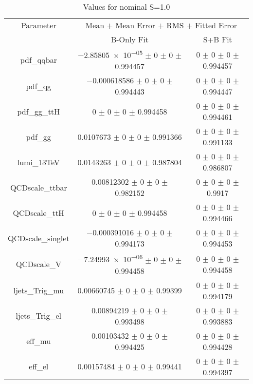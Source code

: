 \begin{table}
\centering
\caption{Values for nominal S=1.0}
\begin{tabular}{ccc}
\toprule
Parameter & \multicolumn{2}{c}{Mean $\pm$ Mean Error $\pm$ RMS $\pm$ Fitted Error}\\
 & B-Only Fit & S+B Fit\\
\midrule
pdf\_qqbar & \num{-2.85805e-05} $\pm$ \num{0} $\pm$ \num{0} $\pm$ \num{0.994457} & \num{0} $\pm$ \num{0} $\pm$ \num{0} $\pm$ \num{0.994457}\\
pdf\_qg & \num{-0.000618586} $\pm$ \num{0} $\pm$ \num{0} $\pm$ \num{0.994443} & \num{0} $\pm$ \num{0} $\pm$ \num{0} $\pm$ \num{0.994447}\\
pdf\_gg\_ttH & \num{0} $\pm$ \num{0} $\pm$ \num{0} $\pm$ \num{0.994458} & \num{0} $\pm$ \num{0} $\pm$ \num{0} $\pm$ \num{0.994461}\\
pdf\_gg & \num{0.0107673} $\pm$ \num{0} $\pm$ \num{0} $\pm$ \num{0.991366} & \num{0} $\pm$ \num{0} $\pm$ \num{0} $\pm$ \num{0.991133}\\
lumi\_13TeV & \num{0.0143263} $\pm$ \num{0} $\pm$ \num{0} $\pm$ \num{0.987804} & \num{0} $\pm$ \num{0} $\pm$ \num{0} $\pm$ \num{0.986807}\\
QCDscale\_ttbar & \num{0.00812302} $\pm$ \num{0} $\pm$ \num{0} $\pm$ \num{0.982152} & \num{0} $\pm$ \num{0} $\pm$ \num{0} $\pm$ \num{0.9917}\\
QCDscale\_ttH & \num{0} $\pm$ \num{0} $\pm$ \num{0} $\pm$ \num{0.994458} & \num{0} $\pm$ \num{0} $\pm$ \num{0} $\pm$ \num{0.994466}\\
QCDscale\_singlet & \num{-0.000391016} $\pm$ \num{0} $\pm$ \num{0} $\pm$ \num{0.994173} & \num{0} $\pm$ \num{0} $\pm$ \num{0} $\pm$ \num{0.994453}\\
QCDscale\_V & \num{-7.24993e-06} $\pm$ \num{0} $\pm$ \num{0} $\pm$ \num{0.994458} & \num{0} $\pm$ \num{0} $\pm$ \num{0} $\pm$ \num{0.994458}\\
ljets\_Trig\_mu & \num{0.00660745} $\pm$ \num{0} $\pm$ \num{0} $\pm$ \num{0.99399} & \num{0} $\pm$ \num{0} $\pm$ \num{0} $\pm$ \num{0.994179}\\
ljets\_Trig\_el & \num{0.00894219} $\pm$ \num{0} $\pm$ \num{0} $\pm$ \num{0.993498} & \num{0} $\pm$ \num{0} $\pm$ \num{0} $\pm$ \num{0.993883}\\
eff\_mu & \num{0.00103432} $\pm$ \num{0} $\pm$ \num{0} $\pm$ \num{0.994425} & \num{0} $\pm$ \num{0} $\pm$ \num{0} $\pm$ \num{0.994428}\\
eff\_el & \num{0.00157484} $\pm$ \num{0} $\pm$ \num{0} $\pm$ \num{0.99441} & \num{0} $\pm$ \num{0} $\pm$ \num{0} $\pm$ \num{0.994397}\\

\end{tabular}
\end{table}
